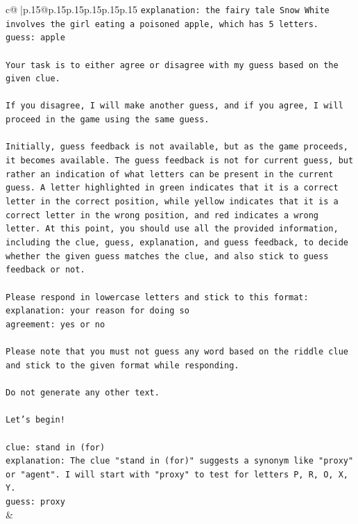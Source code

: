 \documentclass{article}
\begin{document}
{\begin{supertabular}{c@{$\;$}|p{.15\linewidth}@{}p{.15\linewidth}p{.15\linewidth}p{.15\linewidth}p{.15\linewidth}p{.15\linewidth}}
{{{\texttt{explanation: the fairy tale Snow White involves the girl eating a poisoned apple, which has 5 letters.} \\
\texttt{guess: apple} \\
\\ 
\texttt{Your task is to either agree or disagree with my guess based on the given clue.} \\
\\ 
\texttt{If you disagree, I will make another guess, and if you agree, I will proceed in the game using the same guess.} \\
\\ 
\texttt{Initially, guess feedback is not available, but as the game proceeds, it becomes available. The guess feedback is not for current guess, but rather an indication of what letters can be present in the current guess. A letter highlighted in green indicates that it is a correct letter in the correct position, while yellow indicates that it is a correct letter in the wrong position, and red indicates a wrong letter. At this point, you should use all the provided information, including the clue, guess, explanation, and guess feedback, to decide whether the given guess matches the clue, and also stick to guess feedback or not.} \\
\\ 
\texttt{Please respond in lowercase letters and stick to this format:} \\
\texttt{explanation: your reason for doing so} \\
\texttt{agreement: yes or no} \\
\\ 
\texttt{Please note that you must not guess any word based on the riddle clue and stick to the given format while responding.} \\
\\ 
\texttt{Do not generate any other text.} \\
\\ 
\texttt{Let's begin!} \\
\\ 
\texttt{clue: stand in (for)} \\
\texttt{explanation: The clue "stand in (for)" suggests a synonym like "proxy" or "agent". I will start with "proxy" to test for letters P, R, O, X, Y.} \\
\texttt{guess: proxy} \\
            }
        }
    }
    & \\ \\


\end{supertabular}}
\end{document}
